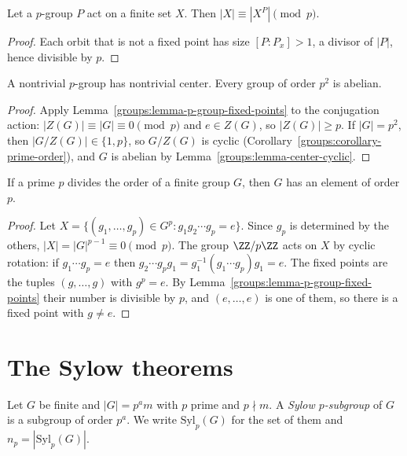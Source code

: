 \begin{lemma}\label{groups:lemma-p-group-fixed-points}
Let a $p$-group $P$ act on a finite set $X$. Then $|X| \equiv |X^P| \pmod p$.
\end{lemma}

\begin{proof}
Each orbit that is not a fixed point has size $[P : P_x] > 1$, a divisor of $|P|$,
hence divisible by $p$.
\end{proof}

\begin{proposition}\label{groups:proposition-p-group-center}
A nontrivial $p$-group has nontrivial center. Every group of order $p^2$ is
abelian.
\end{proposition}

\begin{proof}
Apply Lemma~\ref{groups:lemma-p-group-fixed-points} to the conjugation action:
$|Z(G)| \equiv |G| \equiv 0 \pmod p$ and $e \in Z(G)$, so $|Z(G)| \geq p$. If
$|G| = p^2$, then $|G/Z(G)| \in \{1, p\}$, so $G/Z(G)$ is cyclic
(Corollary~\ref{groups:corollary-prime-order}), and $G$ is abelian by
Lemma~\ref{groups:lemma-center-cyclic}.
\end{proof}

\begin{theorem}[Cauchy]\label{groups:theorem-cauchy}
If a prime $p$ divides the order of a finite group $G$, then $G$ has an element of
order $p$.
\end{theorem}

\begin{proof}
Let $X = \{(g_1, \ldots, g_p) \in G^p : g_1 g_2 \cdots g_p = e\}$. Since $g_p$ is
determined by the others, $|X| = |G|^{p-1} \equiv 0 \pmod p$. The group $\ZZ/p\ZZ$
acts on $X$ by cyclic rotation: if $g_1 \cdots g_p = e$ then
$g_2 \cdots g_p g_1 = g_1^{-1}(g_1 \cdots g_p)g_1 = e$. The fixed points are the tuples
$(g, \ldots, g)$ with $g^p = e$. By Lemma~\ref{groups:lemma-p-group-fixed-points}
their number is divisible by $p$, and $(e, \ldots, e)$ is one of them, so there is
a fixed point with $g \neq e$.
\end{proof}

\section{The Sylow theorems}\label{groups:section-sylow}

\begin{definition}\label{groups:definition-sylow}
Let $G$ be finite and $|G| = p^a m$ with $p$ prime and $p \nmid m$. A \emph{Sylow
$p$-subgroup} of $G$ is a subgroup of order $p^a$. We write $\mathrm{Syl}_p(G)$ for
the set of them and $n_p = |\mathrm{Syl}_p(G)|$.
\end{definition}

